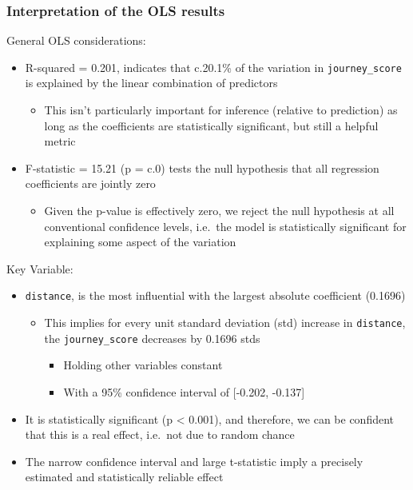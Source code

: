 \documentclass[
  number]{elsarticle}
\providecommand{\tightlist}{%
  \setlength{\itemsep}{0pt}\setlength{\parskip}{0pt}}
\begin{document}
\subsubsection{Interpretation of the OLS
results}\label{sec-interpretation-ols-1}

General OLS considerations:

\begin{itemize}
\tightlist
\item
  R-squared = 0.201, indicates that c.20.1\% of the variation in
  \texttt{\textquotesingle{}journey\_score\textquotesingle{}} is
  explained by the linear combination of predictors

  \begin{itemize}
  \tightlist
  \item
    This isn't particularly important for inference (relative to
    prediction) as long as the coefficients are statistically
    significant, but still a helpful metric
  \end{itemize}
\item
  F-statistic = 15.21 (p = c.0) tests the null hypothesis that all
  regression coefficients are jointly zero

  \begin{itemize}
  \tightlist
  \item
    Given the p-value is effectively zero, we reject the null hypothesis
    at all conventional confidence levels, i.e.~the model is
    statistically significant for explaining some aspect of the
    variation
  \end{itemize}
\end{itemize}

Key Variable:

\begin{itemize}
\tightlist
\item
  \texttt{\textquotesingle{}distance\textquotesingle{}}, is the most
  influential with the largest absolute coefficient (0.1696)

  \begin{itemize}
  \tightlist
  \item
    This implies for every unit standard deviation (std) increase in
    \texttt{\textquotesingle{}distance\textquotesingle{}}, the
    \texttt{\textquotesingle{}journey\_score\textquotesingle{}}
    decreases by 0.1696 stds

    \begin{itemize}
    \tightlist
    \item
      Holding other variables constant
    \item
      With a 95\% confidence interval of {[}-0.202, -0.137{]}
    \end{itemize}
  \end{itemize}
\item
  It is statistically significant (p \textless{} 0.001), and therefore,
  we can be confident that this is a real effect, i.e.~not due to random
  chance
\item
  The narrow confidence interval and large t-statistic imply a precisely
  estimated and statistically reliable effect
\end{itemize}
\end{document}
